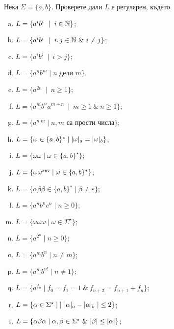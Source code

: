 \begin{extra2}

  \begin{problem}
  Нека $\Sigma = \{a,b\}$.  Проверете дали $L$ е регулярен, където
  \begin{enumerate}[a)]
  \item
    $L = \{a^ib^i\ \mid\ i\in\Nat\}$;
  \item
    $L = \{a^ib^i\ \mid\ i,j\in\Nat\ \&\ i\neq j\}$;
  \item
    $L = \{a^ib^j\ \mid\ i > j\}$;
  \item
    $L = \{a^nb^m \mid n\text{ дели }m\}$.
  \item
    $L = \{a^{2n}\ \mid\ n\geq 1\}$;
  \item
    $L = \{a^mb^na^{m+n}\ \mid\ m\geq 1\ \&\ n\geq 1\}$;
  \item
    $L = \{a^{n.m}\mid n,m\text{ са прости числа}\}$;
  \item
    $L = \{\omega\in\{a,b\}^\star \mid \vert{\omega}\vert_{a} = \vert{\omega}\vert_{b}\}$;
  \item
    $L = \{\omega\omega\mid \omega\in\{a,b\}^\star\}$;
  \item
    $L = \{\omega\omega^{\texttt{rev}}\mid \omega\in\{a,b\}^\star\}$;
  \item
    $L = \{\alpha\beta\beta \in \{a,b\}^\star\mid \beta \neq \varepsilon\}$;
  \item
    $L = \{a^nb^nc^n\mid n\geq 0\}$;
  \item
    $L = \{\omega\omega\omega\mid \omega\in \Sigma^\star\}$;
  \item
    $L = \{a^{2^n}\mid n\geq 0\}$;
  \item
    $L = \{a^mb^n\mid n\neq m\}$;
  \item
    $L = \{a^{n!}b^{n!}\mid n\neq 1\}$;
  \item
    $L = \{a^{f_n} \mid f_0 = f_1 = 1\ \&\ f_{n+2} = f_{n+1} + f_{n}\}$;
  \item
    $L = \{\alpha \in \Sigma^\star \mid \vert{\ \vert{\alpha}\vert_{a} - \vert{\alpha}\vert_{b}\ }\vert \leq 2\}$;
  \item
    $L = \{\alpha\beta\alpha \mid \alpha,\beta \in \Sigma^\star\ \&\ \vert{\beta}\vert \leq \vert{\alpha}\vert\}$;

\end{enumerate}
\end{problem}
\end{extra2}

